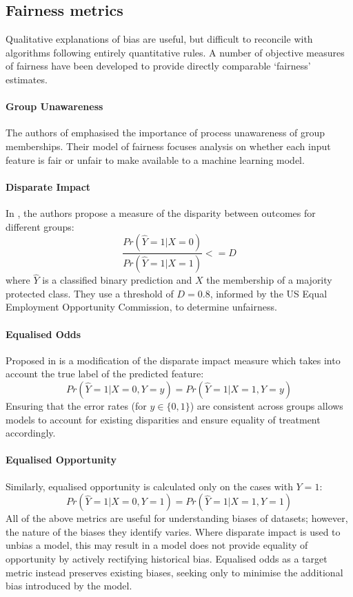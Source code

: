 \documentclass[conference]{IEEEtran}
\begin{document}
\subsection{Fairness metrics}
Qualitative explanations of bias are useful, but difficult to reconcile with algorithms following entirely quantitative rules. A number of objective measures of fairness have been developed to provide directly comparable `fairness' estimates.
\paragraph{Group Unawareness} The authors of \cite{GrgicHlaca2016TheCF} emphasised the importance of process unawareness of group memberships. Their model of fairness focuses analysis on whether each input feature is fair or unfair to make available to a machine learning model.
\paragraph{Disparate Impact} In \cite{10.1145/2783258.2783311}, the authors propose a measure of the disparity between outcomes for different groups: \[\frac{Pr(\hat{Y} = 1 | X = 0)}{Pr(\hat{Y} = 1 | X = 1)} <= D\] where $\hat{Y}$ is a classified binary prediction and $X$ the membership of a majority protected class. They use a threshold of $D = 0.8$, informed by the US
Equal Employment Opportunity Commission, to determine unfairness.
\paragraph{Equalised Odds} Proposed in \cite{DBLP:journals/corr/HardtPS16} is a modification of the disparate impact measure which takes into account the true label of the predicted feature:
\[Pr(\hat{Y} = 1 | X = 0, Y = y) = Pr(\hat{Y} = 1 | X = 1, Y = y)\]
Ensuring that the error rates (for $y \in \{0, 1\}$) are consistent across groups allows models to account for existing disparities and ensure equality of treatment accordingly.
\paragraph{Equalised Opportunity} Similarly, equalised opportunity is calculated only on the cases with $Y = 1$:
\[Pr(\hat{Y} = 1 | X = 0, Y = 1) = Pr(\hat{Y} = 1 | X = 1, Y = 1)\]
All of the above metrics are useful for understanding biases of datasets; however, the nature of the biases they identify varies. Where disparate impact is used to unbias a model, this may result in a model does not provide equality of opportunity by actively rectifying historical bias. Equalised odds as a target metric instead preserves existing biases, seeking only to minimise the additional bias introduced by the model.
\end{document}
